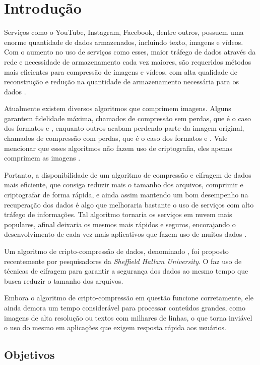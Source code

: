 \chapter{Introdução}
\label{cap1}

Serviços como o YouTube, Instagram, Facebook, dentre outros, possuem uma enorme quantidade de dados armazenados, incluindo texto, imagens e vídeos. Com o aumento no uso de serviços como esses, maior tráfego de dados através da rede e necessidade de armazenamento cada vez maiores, são requeridos métodos mais eficientes para compressão de imagens e vídeos, com alta qualidade de reconstrução e redução na quantidade de armazenamento necessária para os dados \cite{shu13715}.

Atualmente existem diversos algoritmos que comprimem imagens. Alguns garantem fidelidade máxima, chamados de compressão sem perdas, que é o caso dos formatos \png e \tiff, enquanto outros acabam perdendo parte da imagem original, chamados de compressão com perdas, que é o caso dos formatos \jpeg e \gif. Vale mencionar que esses algoritmos não fazem uso de criptografia, eles apenas comprimem as imagens \cite{Salomon2007}.

Portanto, a disponibilidade de um algoritmo de compressão e cifragem de dados mais eficiente, que consiga reduzir mais o tamanho dos arquivos, comprimir e criptografar de forma rápida, e ainda assim mantendo um bom desempenho na recuperação dos dados é algo que melhoraria bastante o uso de serviços com alto tráfego de informações. Tal algoritmo tornaria os serviços em nuvem mais populares, afinal deixaria os mesmos mais rápidos e seguros, encorajando o desenvolvimento de cada vez mais aplicativos que fazem uso de muitos dados \cite{Stallings2014}.

Um algoritmo de cripto-compressão de dados, denominado \gmpr \cite{shu13715}, foi proposto recentemente por pesquisadores da \textit{Sheffield Hallam University}. O \gmpr faz uso de técnicas de cifragem para garantir a segurança dos dados ao mesmo tempo que busca reduzir o tamanho dos arquivos.

Embora o algoritmo de cripto-compressão em questão funcione corretamente, ele ainda demora um tempo considerável para processar conteúdos grandes, como imagens de alta resolução ou textos com milhares de linhas, o que torna inviável o uso do mesmo em aplicações que exigem resposta rápida aos usuários.

\section{Objetivos}

